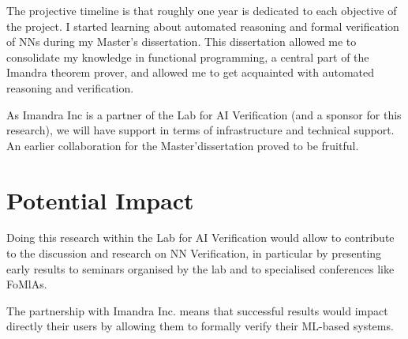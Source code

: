 \documentclass[]{article}
\begin{document}
The projective timeline is that roughly one year is dedicated to each objective of the project.
I started learning about automated reasoning and formal verification of NNs during my Master's dissertation. This dissertation allowed me to consolidate my knowledge in functional programming, a central part of the Imandra theorem prover, and allowed me to get acquainted with automated reasoning and verification.

As Imandra Inc is a partner of the Lab for AI Verification (and a sponsor for this research), we will have support in terms of infrastructure and technical support. An earlier collaboration for the Master'dissertation proved to be fruitful.



\section{Potential Impact}
Doing this research within the Lab for AI Verification would allow to contribute to the discussion and research on NN Verification, in particular by presenting early results to seminars organised by the lab and to specialised conferences like FoMlAs.

The partnership with Imandra Inc. means that successful results would impact directly their users by allowing them to formally verify their ML-based systems.
\end{document}
